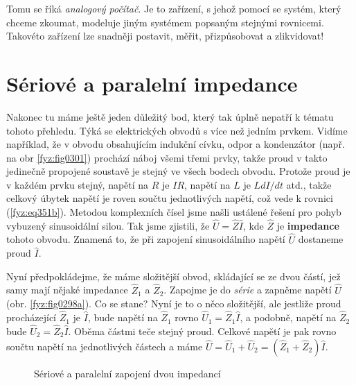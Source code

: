     Tomu se říká \emph{analogový počítač}. Je to zařízení, s jehož pomocí se systém, který chceme 
    zkoumat, modeluje jiným systémem popsaným stejnými rovnicemi. Takovéto zařízení lze snadněji 
    postavit, měřit, přizpůsobovat a zlikvidovat!
    
  \section{Sériové a paralelní impedance}\label{fyz:IchapXXVsecV}
    Nakonec tu máme ještě jeden důležitý bod, který tak úplně nepatří k tématu tohoto přehledu. 
    Týká se elektrických obvodů s více než jedním prvkem. Vidíme například, že v obvodu obsahujícím 
    indukční cívku, odpor a kondenzátor (např. na obr \ref{fyz:fig0301}) prochází náboj všemi třemi 
    prvky, takže proud v takto jedinečně propojené soustavě je stejný ve všech bodech obvodu. 
    Protože proud je v každém prvku stejný, napětí na \(R\) je \(IR\), napětí na \(L\) je 
    \(LdI/dt\) atd., takže celkový úbytek napětí je roven součtu jednotlivých napětí, což vede k 
    rovnici (\ref{fyz:eq351b}). Metodou komplexních čísel jsme našli ustálené řešení pro pohyb 
    vybuzený sinusoidální silou. Tak jsme zjistili, že \(\hat{U}=\hat{Z}\hat{I}\), kde \(\hat{Z}\) 
    je \textbf{impedance} tohoto obvodu. Znamená to, že při zapojení sinusoidálního napětí 
    \(\hat{U}\) dostaneme proud \(\hat{I}\).
    
    Nyní předpokládejme, že máme složitější obvod, skládající se ze dvou částí, jež samy mají 
    nějaké impedance \(\hat{Z}_1\) a \(\hat{Z}_2\). Zapojme je do \emph{série} a zapněme napětí 
    \(\hat{U}\) (obr. \ref{fyz:fig0298a}). Co se stane? Nyní je to o něco složitější, ale jestliže 
    proud procházející \(\hat{Z}_1\) je \(\hat{I}\), bude napětí na \(\hat{Z}_1\) rovno 
    \(\hat{U}_1=\hat{Z}_1\hat{I}\), a podobně, napětí na \(\hat{Z}_2\) bude 
    \(\hat{U}_2=\hat{Z}_2\hat{I}\). Oběma částmi teče stejný proud. Celkové napětí je pak rovno 
    součtu napětí na jednotlivých částech a máme \(\hat{U} = \hat{U}_1 + \hat{U}_2 = (\hat{Z}_1 + 
    \hat{Z}_2)\hat{I}\).

    \begin{figure}[ht!]      %
      \centering
      \caption{Sériové a paralelní zapojení dvou impedancí \cite[s.~342]{Feynman01}}
      \label{fyz:fig0298}
    \end{figure}

